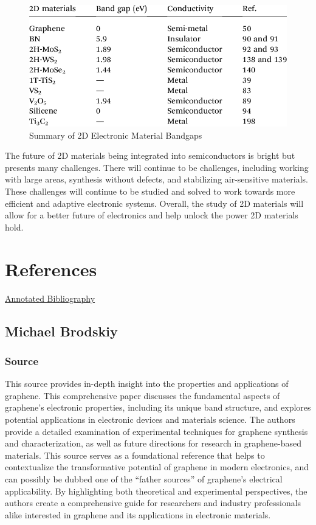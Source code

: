 \documentclass[conference]{IEEEtran}
\begin{document}
\begin{figure}[h]
  \centering
  \includegraphics[width=.5\textwidth]{Figures/SummaryTable}
  \caption{Summary of 2D Electronic Material Bandgaps}
  \label{fig:4}
\end{figure}

The future of 2D materials being integrated into semiconductors is bright but presents many challenges. There will continue to be challenges, including working with large areas, synthesis without defects, and stabilizing air-sensitive materials. These challenges will continue to be studied and solved to work towards more efficient and adaptive electronic systems. Overall, the study of 2D materials will allow for a better future of electronics and help unlock the power 2D materials hold.

\newpage

\section*{References}

\begin{center}
  \underline{Annotated Bibliography}
\end{center}

\subsection{Michael Brodskiy}

\subsubsection{Source \cite{mb4}}

This source provides in-depth insight into the properties and applications of graphene. This comprehensive paper discusses the fundamental aspects of graphene's electronic properties, including its unique band structure, and explores potential applications in electronic devices and materials science. The authors provide a detailed examination of experimental techniques for graphene synthesis and characterization, as well as future directions for research in graphene-based materials. This source serves as a foundational reference that helps to contextualize the transformative potential of graphene in modern electronics, and can possibly be dubbed one of the ``father sources'' of graphene's electrical applicability. By highlighting both theoretical and experimental perspectives, the authors create a comprehensive guide for researchers and industry professionals alike interested in graphene and its applications in electronic materials.
\end{document}
